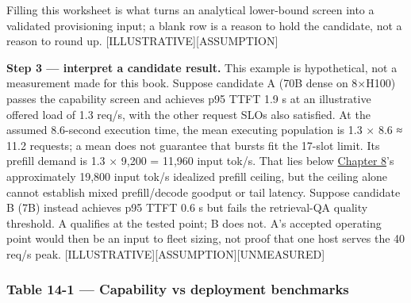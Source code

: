 Filling this worksheet is what turns an analytical lower-bound screen
into a validated provisioning input; a blank row is a reason to hold the
candidate, not a reason to round up. \mbox{{[}ILLUSTRATIVE{]}}\hspace{0pt}\mbox{{[}ASSUMPTION{]}}

\textbf{Step 3 --- interpret a candidate result.} This example is
hypothetical, not a measurement made for this book. Suppose candidate A
(70B dense on 8×H100) passes the capability screen and achieves p95 TTFT
1.9 s at an illustrative offered load of 1.3 req/s, with the other
request SLOs also satisfied. At the assumed 8.6-second execution time,
the mean executing population is 1.3 × 8.6 ≈ 11.2 requests; a mean does
not guarantee that bursts fit the 17-slot limit. Its prefill demand is
1.3 × 9,200 = 11,960 input tok/s. That lies below \hyperref[chap:8]{Chapter 8}'s
approximately 19,800 input tok/s idealized prefill ceiling, but the
ceiling alone cannot establish mixed prefill/decode goodput or tail
latency. Suppose candidate B (7B) instead achieves p95 TTFT 0.6 s but
fails the retrieval-QA quality threshold. A qualifies at the tested
point; B does not. A's accepted operating point would then be an input
to fleet sizing, not proof that one host serves the 40 req/s peak.
\mbox{{[}ILLUSTRATIVE{]}}\hspace{0pt}\mbox{{[}ASSUMPTION{]}}\hspace{0pt}\mbox{{[}UNMEASURED{]}}

\subsubsection{Table 14-1 --- Capability vs deployment
benchmarks}\label{table-14-1-capability-vs-deployment-benchmarks}

